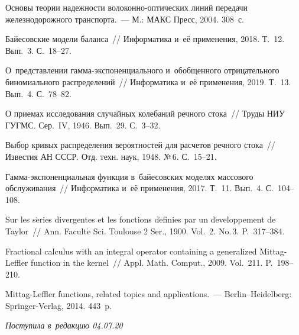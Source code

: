 \begin{multicols}{2}
{{\begin{thebibliography}{99}
Основы теории надежности волоконно-оптических линий передачи железнодорожного 
транспорта.~--- М.: МАКС Пресс, 2004. 308~с.

Байесовские модели баланса~// Информатика и~её применения, 2018. 
Т.~12. Вып.~3. С.~18--27.

О~пред\-став\-ле\-нии гам\-ма-экс\-по\-нен\-ци\-аль\-но\-го 
и~обобщенного отрицательного биномиального распределений~// Информатика 
и~её применения, 2019. Т.~13. Вып.~4. С.~78--82.

О приемах исследования случайных колебаний речного стока~// 
Труды НИУ ГУГМС. Сер.~IV, 1946. Вып.~29. С.~3--32.

Выбор кривых распределения вероятностей для расчетов речного стока~// 
Известия АН СССР. Отд. техн. наук, 1948. №\,6. С.~15--21.

Гам\-ма-экс\-по\-нен\-ци\-аль\-ная функция в~байесовских моделях массового обслуживания~// 
Информатика и~её применения, 2017. Т.~11. Вып.~4. С.~104--108.

Sur les s$\acute{\mbox{e}}$ries divergentes et les fonctions 
d$\acute{\mbox{e}}$finies par un d$\acute{\mbox{e}}$veloppement de Taylor~// 
Ann. Facult$\acute{\mbox{e}}$ Sci.
Toulouse 2 Ser., 1900. 
Vol.~2. No.\,3. P.~317--384.

Fractional calculus with an integral operator containing a generalized 
Mittag-Leffler function in the kernel~// 
Appl. Math. Comput., 2009. Vol.~211. P.~198--210.

Mittag-Leffler functions, related topics and applications.~--- 
Berlin--Heidelberg: Springer-Verlag, 2014. 443~p.
\end{thebibliography}

 }
 }

\end{multicols}

\vspace*{-6pt}

\hfill{\small\textit{Поступила в~редакцию 04.07.20}}

